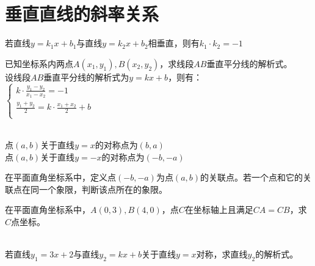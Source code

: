 \section{垂直直线的斜率关系}
\begin{theorem}
    若直线$y=k_1x+b_1$与直线$y=k_2x+b_2$相垂直，则有$k_1·k_2=-1$
\end{theorem}
\begin{example}
    已知坐标系内两点$A(x_1,y_1),B(x_2,y_2)$，求线段$AB$垂直平分线的解析式。\\
    设线段$AB$垂直平分线的解析式为$y=kx+b$，则有： \\
    $\begin{cases}k·\frac{y_1-y_2}{x_1-x_2}=-1 \\ \frac{y_1+y_2}{2}=k·\frac{x_1+x_2}{2}+b \\ \end{cases}$
\end{example}
\begin{corollary}
    \quad \\
    点$(a,b)$关于直线$y=x$的对称点为$(b,a)$ \\
    点$(a,b)$关于直线$y=-x$的对称点为$(-b,-a)$
\end{corollary}
\begin{problem}
在平面直角坐标系中，定义点$(-b,-a)$为点$(a,b)$的关联点。若一个点和它的关联点在同一个象限，判断该点所在的象限。
\end{problem}
\begin{problem}
在平面直角坐标系中，$A(0,3),B(4,0)$，点$C$在坐标轴上且满足$CA=CB$，求$C$点坐标。 \\
\\
\end{problem}
\begin{problem}
若直线$y_1=3x+2$与直线$y_2=kx+b$关于直线$y=x$对称，求直线$y_2$的解析式。 \\
\\
\end{problem}

\clearpage
